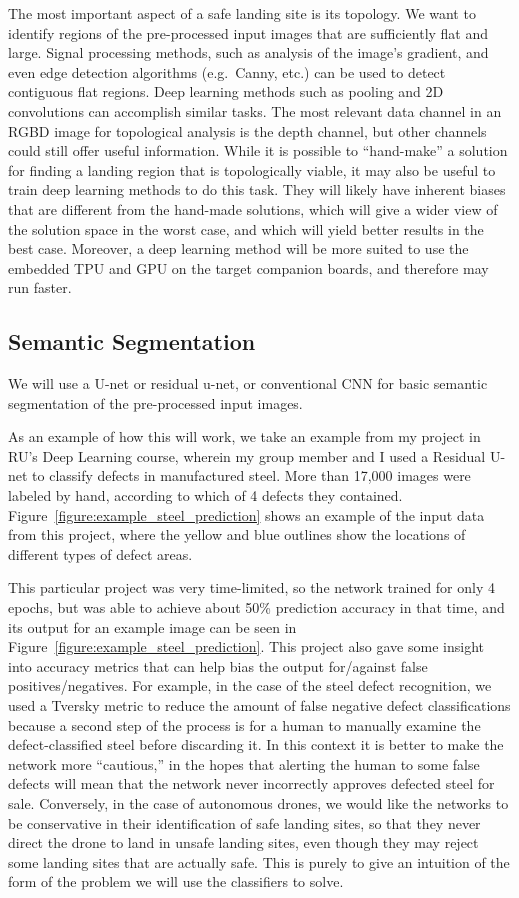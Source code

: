 The most important aspect of a safe landing site is its topology.
We want to identify regions of the pre-processed input images that are sufficiently flat and large.
Signal processing methods, such as analysis of the image's gradient, and even edge detection algorithms (e.g.~Canny, etc.)
can be used to detect contiguous flat regions.
Deep learning methods such as pooling and 2D convolutions can accomplish similar tasks.
The most relevant data channel in an RGBD image for topological analysis is the depth channel,
but other channels could still offer useful information.
While it is possible to ``hand-make'' a solution for finding a landing region that is topologically viable,
it may also be useful to train deep learning methods to do this task.
They will likely have inherent biases that are different from the hand-made solutions,
which will give a wider view of the solution space in the worst case,
and which will yield better results in the best case.
Moreover, a deep learning method will be more suited to use the embedded TPU and GPU on the target companion boards,
and therefore may run faster.

\subsection{Semantic Segmentation}



We will use a U-net or residual u-net, or conventional CNN for basic semantic segmentation of the pre-processed input images.


As an example of how this will work, we take an example from my project in RU's Deep Learning
course, wherein my group member and I used a Residual U-net to classify defects
in manufactured steel.
More than 17,000 images were labeled by hand, according to which of 4 defects they contained.
Figure~\ref{figure:example_steel_prediction} shows an example of the input data from this project,
where the yellow and blue outlines show the locations of different types of defect areas.

This particular project was very time-limited, so the network trained for only 4 epochs,
but was able to achieve about 50\% prediction accuracy in that time,
and its output for an example image can be seen in Figure~\ref{figure:example_steel_prediction}.
This project also gave some insight into accuracy metrics that can help bias the output
for/against false positives/negatives.
For example, in the case of the steel defect recognition, we used a Tversky metric to
reduce the amount of false negative defect classifications because a second step of the
process is for a human to manually examine the defect-classified steel before discarding it.
In this context it is better to make the network more ``cautious,'' in the hopes that
alerting the human to some false defects will mean that the network never incorrectly approves
defected steel for sale.
Conversely, in the case of autonomous drones,
we would like the networks to be conservative in their identification of safe landing sites,
so that they never direct the drone to land in unsafe landing sites, even though they may reject
some landing sites that are actually safe.
This is purely to give an intuition of the form of the problem we will use the classifiers to solve.

